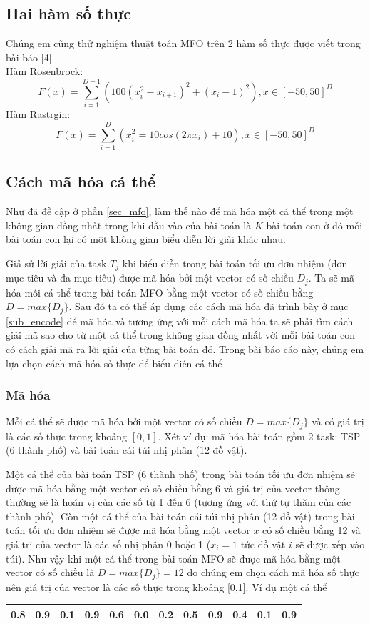 \documentclass[a4paper,12pt]{report}
\begin{document}
\subsection{Hai hàm số thực} 
Chúng em cũng thử nghiệm thuật toán MFO trên 2 hàm số thực được viết trong bài báo [4]\\
Hàm Rosenbrock: 
$$F(x)=\sum_{i=1}^{D-1}(100(x_i^2-x_{i+1})^2+(x_i-1)^2),x \in [-50,50]^D $$
Hàm Rastrgin:
$$F(x)=\sum_{i=1}^D(x_i^2=10cos(2\pi x_i)+10),x \in [-50,50]^D$$

\subsection{Cách mã hóa cá thể}
Như đã đề cập ở phần \ref{sec_mfo}, làm thế nào để mã hóa một cá thể trong một không gian đồng nhất trong khi đầu vào của bài toán là $K$ bài toán con ở đó mỗi bài toán con lại có một không gian biểu diễn lời giải khác nhau.
\par Giả sử lời giải của task $T_j$ khi biểu diễn trong bài toán tối ưu đơn nhiệm (đơn mục tiêu và đa mục tiêu) được mã hóa bởi một vector có số chiều $D_j$. Ta sẽ mã hóa mỗi cá thể trong bài toán MFO bằng một vector có số chiều bằng $D = max\{D_j\}$. Sau đó ta có thể áp dụng các cách mã hóa đã trình bày ở mục \ref{sub_encode}  để mã hóa và tương ứng với mỗi cách mã hóa ta sẽ phải tìm cách giải mã sao cho từ một cá thể trong không gian đồng nhất với mỗi bài toán con có cách giải mã ra lời giải của từng bài toán đó. Trong bài báo cáo này, chúng em lựa chọn cách mã hóa số thực để biểu diễn cá thể
\subsubsection{Mã hóa}
Mỗi cá thể sẽ được mã hóa bởi một vector có số chiều $D = max\{D_j\}$ và có giá trị là các số thực trong khoảng $[0,1]$. Xét ví dụ: mã hóa bài toán gồm 2 task: TSP (6 thành phố) và bài toán cái túi nhị phân (12 đồ vật).
\par Một cá thể của bài toán TSP (6 thành phố) trong bài toán tối ưu đơn nhiệm sẽ được mã hóa bằng một vector có số chiều bằng 6 và giá trị của vector thông thường sẽ là hoán vị của các số từ 1 đến 6 (tương ứng với thứ tự thăm của các thành phố). Còn một cá thể của bài toán cái túi nhị phân (12 đồ vật) trong bài toán tối ưu đơn nhiệm sẽ được mã hóa bằng một vector $x$ có số chiều bằng 12 và giá trị của vector là các số nhị phân 0 hoặc 1 ($x_i=1$ tức đồ vật $i$ sẽ được xếp vào túi). Như vậy khi một cá thể trong bài toán MFO sẽ được mã hóa bằng một vector có số chiều là $D = max\{D_j\} = 12$ do chúng em chọn cách mã hóa số thực nên giá trị của vector là các số thực trong khoảng [0,1]. Ví dụ một cá thể \cite{MFO-slide}
\begin{longtable}{|c|c|c|c|c|c|c|c|c|c|c|c|}
\hline
0.8 & 0.9 & 0.1 & 0.9 & 0.6 & 0.0 & 0.2 & 0.5 & 0.9 & 0.4 & 0.1 & 0.9\\
\hline
\end{longtable}
\end{document}
